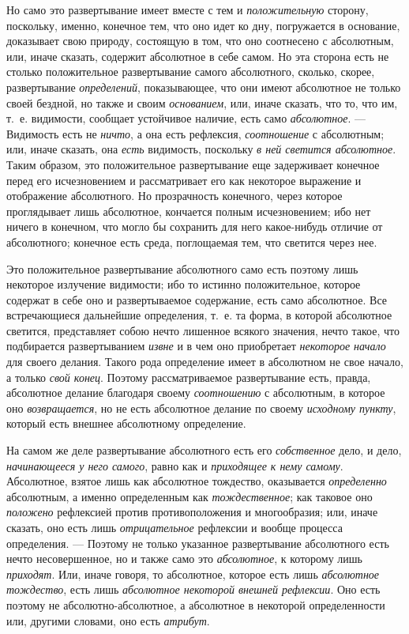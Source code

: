 Но само это развертывание имеет вместе с тем и
{\em положительную} сторону, поскольку, именно,
конечное тем, что оно идет ко дну, погружается в основание, доказывает свою
природу, состоящую в том, что оно соотнесено с абсолютным, или, иначе
сказать, содержит абсолютное в себе самом. Но эта сторона есть не столько
положительное развертывание самого абсолютного, сколько, скорее,
развертывание {\em определений}, показывающее, что они
имеют абсолютное не только своей бездной, но также и своим
{\em основанием}, или, иначе сказать, что то, что им,
т.~е. видимости, сообщает устойчивое наличие, есть само
{\em абсолютное}. — Видимость есть не
{\em ничто}, а она есть рефлексия,
{\em соотношение} с абсолютным; или, иначе сказать, она
{\em есть} видимость, поскольку
{\em в ней светится абсолютное}. Таким образом, это
положительное развертывание еще задерживает конечное перед его
исчезновением и рассматривает его как некоторое выражение и отображение
абсолютного. Но прозрачность конечного, через которое проглядывает лишь
абсолютное, кончается полным исчезновением; ибо нет ничего в конечном, что
могло бы сохранить для него какое-нибудь отличие от абсолютного; конечное
есть среда, поглощаемая тем, что светится через нее.

Это положительное развертывание абсолютного само есть поэтому лишь некоторое
излучение видимости; ибо то истинно положительное, которое содержат в себе
оно и развертываемое содержание, есть само абсолютное. Все встречающиеся
дальнейшие определения, т.~е. та форма, в которой абсолютное светится,
представляет собою нечто лишенное всякого значения, нечто такое, что
подбирается развертыванием {\em извне} и в чем оно
приобретает {\em некоторое начало} для своего делания.
Такого рода определение имеет в абсолютном не свое начало, а только
{\em свой конец}. Поэтому рассматриваемое развертывание
есть, правда, абсолютное делание благодаря своему
{\em соотношению} с абсолютным, в которое оно
{\em возвращается}, но не есть абсолютное делание по
своему {\em исходному пункту}, который есть внешнее
абсолютному определение.

На самом же деле развертывание абсолютного есть его
{\em собственное} дело, и дело,
{\em начинающееся у него самого}, равно как и
{\em приходящее к нему самому}. Абсолютное, взятое лишь
как абсолютное тождество, оказывается {\em определенно}
абсолютным, а именно определенным как
{\em тождественное}; как таковое оно
{\em положено} рефлексией против противоположения и
многообразия; или, иначе сказать, оно есть лишь
{\em отрицательное} рефлексии и вообще процесса
определения. — Поэтому не только указанное развертывание абсолютного есть
нечто несовершенное, но и также само это
{\em абсолютное}, к которому лишь
{\em приходят}. Или, иначе говоря, то абсолютное,
которое есть лишь {\em абсолютное тождество}, есть лишь
{\em абсолютное некоторой внешней рефлексии}. Оно есть
поэтому не абсолютно-абсолютное, а абсолютное в некоторой определенности
или, другими словами, оно есть {\em атрибут}.

